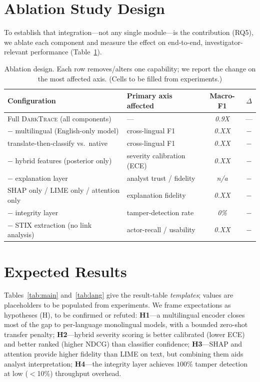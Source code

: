 \documentclass[11pt,a4paper]{article}
\newcommand{\framework}{\textsc{DarkTrace}}
\begin{document}
\section{Ablation Study Design}\label{sec:ablation}

To establish that integration---not any single module---is the contribution (RQ5), we
ablate each component and measure the effect on end-to-end, investigator-relevant
performance (Table~\ref{tab:ablation}).

\begin{table}[t]
\centering
\caption{Ablation design. Each row removes/alters one capability; we report the change
on the most affected axis. (Cells to be filled from experiments.)}
\label{tab:ablation}
\small
\begin{tabular}{@{}p{5.4cm}p{4.0cm}cc@{}}
\toprule
\textbf{Configuration} & \textbf{Primary axis affected} & \textbf{Macro-F1} & \textbf{$\Delta$} \\
\midrule
Full \framework{} (all components) & --- & \emph{0.9X} & --- \\
$-$ multilingual (English-only model) & cross-lingual F1 & \emph{0.XX} & \emph{$-$} \\
\;translate-then-classify vs.\ native & cross-lingual F1 & \emph{0.XX} & \emph{$-$} \\
$-$ hybrid features (posterior only) & severity calibration (ECE) & \emph{0.XX} & \emph{$-$} \\
$-$ explanation layer & analyst trust / fidelity & \emph{n/a} & \emph{$-$} \\
\;SHAP only / LIME only / attention only & explanation fidelity & \emph{0.XX} & \emph{$-$} \\
$-$ integrity layer & tamper-detection rate & \emph{0\%} & \emph{$-$} \\
$-$ STIX extraction (no link analysis) & actor-recall / usability & \emph{0.XX} & \emph{$-$} \\
\bottomrule
\end{tabular}
\end{table}

\section{Expected Results}\label{sec:results}

Tables~\ref{tab:main} and~\ref{tab:lang} give the result-table \emph{templates}; values
are placeholders to be populated from experiments. We frame expectations as hypotheses
(H), to be confirmed or refuted: \textbf{H1}---a multilingual encoder closes most of the
gap to per-language monolingual models, with a bounded zero-shot transfer penalty;
\textbf{H2}---hybrid severity scoring is better calibrated (lower ECE) and better ranked
(higher NDCG) than classifier confidence; \textbf{H3}---SHAP and attention provide higher
fidelity than LIME on text, but combining them aids analyst interpretation;
\textbf{H4}---the integrity layer achieves $100\%$ tamper detection at low ($<$10\%)
throughput overhead.
\end{document}
